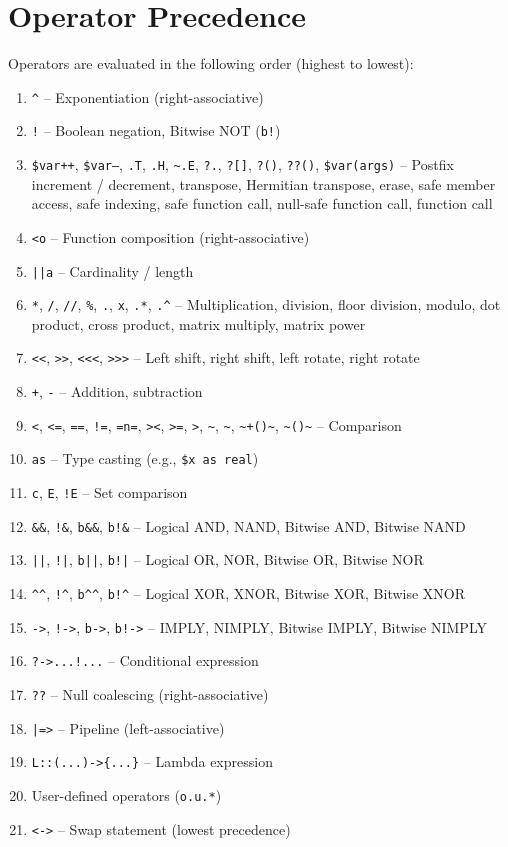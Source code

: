\section{Operator Precedence}
Operators are evaluated in the following order (highest to lowest):
\begin{enumerate}
\item \texttt{\^{}} -- Exponentiation (right-associative)
\item \texttt{!} -- Boolean negation, Bitwise NOT (\texttt{b!})
\item \texttt{\$var++}, \texttt{\$var--}, \texttt{.T}, \texttt{.H}, \texttt{\textasciitilde.E}, \texttt{?.}, \texttt{?[]}, \texttt{?()}, \texttt{??()}, \texttt{\$var(args)} -- Postfix increment / decrement, transpose, Hermitian transpose, erase, safe member access, safe indexing, safe function call, null-safe function call, function call
\item \texttt{<o} -- Function composition (right-associative)
\item \texttt{||a} -- Cardinality / length
\item \texttt{*}, \texttt{/}, \texttt{//}, \texttt{\%}, \texttt{.}, \texttt{x}, \texttt{.*}, \texttt{.\^{}} -- Multiplication, division, floor division, modulo, dot product, cross product, matrix multiply, matrix power
\item \texttt{<<}, \texttt{>>}, \texttt{<<<}, \texttt{>>>} -- Left shift, right shift, left rotate, right rotate
\item \texttt{+}, \texttt{-} -- Addition, subtraction
\item \texttt{<}, \texttt{<=}, \texttt{==}, \texttt{!=}, \texttt{=n=}, \texttt{><}, \texttt{>=}, \texttt{>}, \texttt{\textasciitilde}, \texttt{\textasciitilde*}, \texttt{\textasciitilde+()\textasciitilde}, \texttt{\textasciitilde*()\textasciitilde} -- Comparison
\item \texttt{as} -- Type casting (e.g., \texttt{\$x as real})
\item \texttt{c}, \texttt{E}, \texttt{!E} -- Set comparison
\item \texttt{\&\&}, \texttt{!\&}, \texttt{b\&\&}, \texttt{b!\&} -- Logical AND, NAND, Bitwise AND, Bitwise NAND
\item \texttt{||}, \texttt{!|}, \texttt{b||}, \texttt{b!|} -- Logical OR, NOR, Bitwise OR, Bitwise NOR
\item \texttt{\^{}\^{}}, \texttt{!}\texttt{\^{}}, \texttt{b\^{}}\texttt{\^{}}, \texttt{b!}\texttt{\^{}} -- Logical XOR, XNOR, Bitwise XOR, Bitwise XNOR
\item \texttt{->}, \texttt{!->}, \texttt{b->}, \texttt{b!->} -- IMPLY, NIMPLY, Bitwise IMPLY, Bitwise NIMPLY
\item \texttt{?->...!...} -- Conditional expression
\item \texttt{??} -- Null coalescing (right-associative)
\item \texttt{|=>} -- Pipeline (left-associative)
\item \texttt{L::(...)->\{...\}} -- Lambda expression
\item User-defined operators (\texttt{o.u.*})
\item \texttt{<->} -- Swap statement (lowest precedence)
\end{enumerate}

